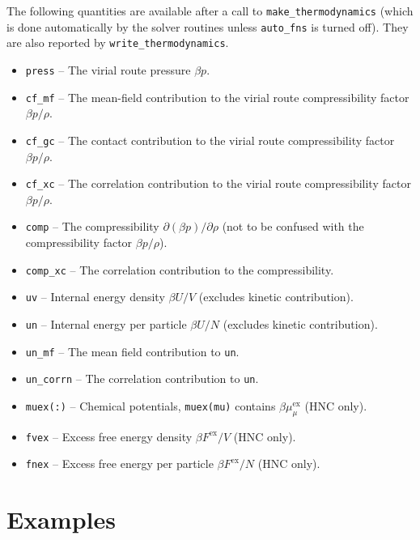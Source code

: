 \documentclass[12pt,a4paper]{article}
\newcommand{\myex}{^{\mathrm{ex}}}
\newcommand{\Fex}{F\myex}
\newcommand{\muex}{\mu\myex}
\begin{document}
%
The following quantities are available after a call to
\verb+make_thermodynamics+ (which is done automatically by the solver
routines unless \verb+auto_fns+ is turned off).  They are also
reported by \verb+write_thermodynamics+.
%
\begin{itemize}
%
\item\verb+press+ -- The virial route pressure $\beta p$.
%
\item\verb+cf_mf+ -- The mean-field contribution to the
virial route compressibility factor $\beta p/\rho$.
%
\item\verb+cf_gc+ -- The contact contribution to the
virial route compressibility factor $\beta p/\rho$.
%
\item\verb+cf_xc+ -- The correlation contribution to the
 virial route compressibility factor $\beta p/\rho$.
%
\item\verb+comp+ -- The compressibility $\partial(\beta
  p)/\partial\rho$ (not to be confused with the 
  compressibility factor $\beta p/\rho$).
%
\item\verb+comp_xc+ -- The correlation contribution to the
  compressibility.
%
\item\verb+uv+ -- Internal energy density $\beta U/V$ (excludes
  kinetic contribution).
%
\item\verb+un+ -- Internal energy per particle $\beta U/N$ (excludes
  kinetic contribution).
%
\item\verb+un_mf+ -- The mean field contribution to \verb+un+.
%
\item\verb+un_corrn+ -- The correlation contribution to \verb+un+.
%
\item\verb+muex(:)+ -- Chemical potentials, \verb+muex(mu)+ contains
  $\beta\muex_\mu$ (HNC only).
%
\item\verb+fvex+ -- Excess free energy density $\beta \Fex/V$ (HNC only).
%
\item\verb+fnex+ -- Excess free energy per particle $\beta \Fex/N$ (HNC only).
%
\end{itemize}

\section{Examples}
%
\end{document}
